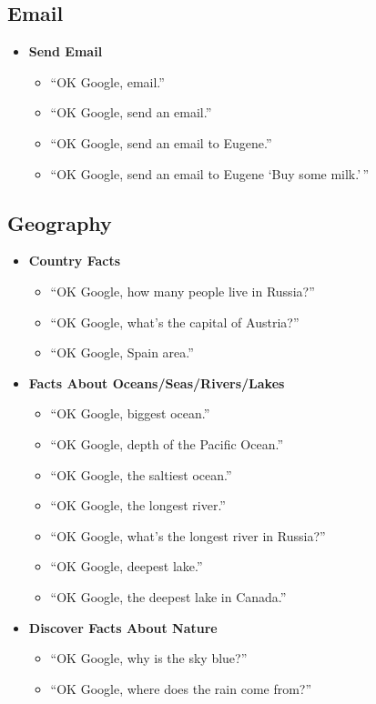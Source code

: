 \documentclass[
  jou,
  floatsintext,
  longtable,
  a4paper,
  nolmodern,
  notxfonts,
  notimes,
  12pt,
  colorlinks=true,linkcolor=blue,citecolor=blue,urlcolor=blue]{apa7}
\providecommand{\tightlist}{%
  \setlength{\itemsep}{0pt}\setlength{\parskip}{0pt}}
\begin{document}
\subsection{Email}\label{email}

\begin{itemize}
\tightlist
\item
  \textbf{Send Email}

  \begin{itemize}
  \tightlist
  \item
    ``OK Google, email.''
  \item
    ``OK Google, send an email.''
  \item
    ``OK Google, send an email to Eugene.''
  \item
    ``OK Google, send an email to Eugene `Buy some milk.'\,''
  \end{itemize}
\end{itemize}

\subsection{Geography}\label{geography}

\begin{itemize}
\tightlist
\item
  \textbf{Country Facts}

  \begin{itemize}
  \tightlist
  \item
    ``OK Google, how many people live in Russia?''
  \item
    ``OK Google, what's the capital of Austria?''
  \item
    ``OK Google, Spain area.''
  \end{itemize}
\item
  \textbf{Facts About Oceans/Seas/Rivers/Lakes}

  \begin{itemize}
  \tightlist
  \item
    ``OK Google, biggest ocean.''
  \item
    ``OK Google, depth of the Pacific Ocean.''
  \item
    ``OK Google, the saltiest ocean.''
  \item
    ``OK Google, the longest river.''
  \item
    ``OK Google, what's the longest river in Russia?''
  \item
    ``OK Google, deepest lake.''
  \item
    ``OK Google, the deepest lake in Canada.''
  \end{itemize}
\item
  \textbf{Discover Facts About Nature}

  \begin{itemize}
  \tightlist
  \item
    ``OK Google, why is the sky blue?''
  \item
    ``OK Google, where does the rain come from?''
  \end{itemize}
\end{itemize}
\end{document}
